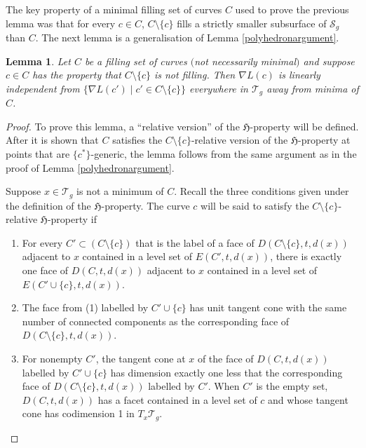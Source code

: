 \documentclass[pdftex]{sigma}
\numberwithin{equation}{section}
\newtheorem{Lemma}[Theorem]{Lemma}
\begin{document}
The key property of a minimal filling set of curves $C$ used to prove the previous lemma was that for every $c\in C$, $C\setminus\{c\}$ fills a strictly smaller subsurface of $\mathcal{S}_{g}$ than $C$. The next lemma is a generalisation of Lemma \ref{polyhedronargument}.

\begin{Lemma}
\label{neededtofill}
Let $C$ be a filling set of curves $($not necessarily minimal$)$ and suppose $c\in C$ has the property that $C\setminus\{c\}$ is not filling. Then $\nabla L(c)$ is linearly independent from $\{\nabla L(c') \mid c'\in C\setminus \{c\}\}$ everywhere in $\mathcal{T}_{g}$ away from minima of $C$.
\end{Lemma}

\begin{proof}
To prove this lemma, a ``relative version'' of the $\mathfrak{H}$-property will be defined. After it is shown that $C$ satisfies the $C\setminus\{c\}$-relative version of the $\mathfrak{H}$-property at points that are $\{c^{*}\}$-generic, the lemma follows from the same argument as in the proof of Lemma \ref{polyhedronargument}.

Suppose $x\in \mathcal{T}_{g}$ is not a minimum of $C$. Recall the three conditions given under the definition of the $\mathfrak{H}$-property. The curve $c$ will be said to satisfy the $C\setminus \{c\}$-relative $\mathfrak{H}$-property if
\begin{enumerate}\itemsep=0pt
\item[(1)] For every $C'\subset (C\setminus \{c\})$ that is the label of a face of $D(C\setminus\{c\},t,d(x))$ adjacent to $x$ contained in a level set of $E(C',t,d(x))$, there is exactly one face of $D(C,t,d(x))$ adjacent to $x$ contained in a level set of $E(C'\cup\{c\},t,d(x))$.
\item[(2)] The face from (1) labelled by $C'\cup\{c\}$ has unit tangent cone with the same number of connected components as the corresponding face of $D(C\setminus\{c\},t,d(x))$.
\item[(3)] For nonempty $C'$, the tangent cone at $x$ of the face of $D(C,t,d(x))$ labelled by $C'\cup \{c\}$ has dimension exactly one less that the corresponding face of $D(C\setminus\{c\},t,d(x))$ labelled by $C'$. When $C'$ is the empty set, $D(C,t,d(x))$ has a facet contained in a level set of $c$ and whose tangent cone has codimension 1 in $T_{x}\mathcal{T}_{g}$.
\end{enumerate}


\end{proof}
\end{document}

